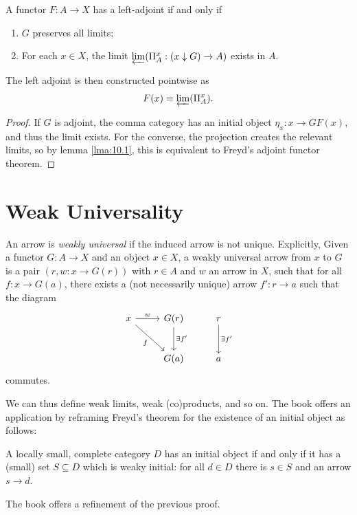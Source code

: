 \begin{theorem}\label{thm:10.1}
	A functor $F : A \to X$ has a left-adjoint if and only if
	\begin{enumerate}
		\item $G$ preserves all limits;
		\item For each $x\in X$, the limit $\varprojlim (\Pi_A^x : (x\downarrow G) \to A)$ exists in $A$.
	\end{enumerate}
	The left adjoint is then constructed pointwise as
	\[
		F(x)=\varprojlim (\Pi_A^x)
	.\]
\end{theorem}
\begin{proof}
	If $G$ is adjoint, the comma category has an initial object $\eta_x : x \to GF(x)$, and thus the limit exists. For the converse, the projection creates the relevant limits, so by lemma \ref{lma:10.1}, this is equivalent to Freyd's adjoint functor theorem.
\end{proof}

\section{Weak Universality}

\begin{definition}\label{dfn:10.1}
	An arrow is \emph{weakly universal} if the induced arrow is not unique. Explicitly, Given a functor $G : A \to X$ and an object $x\in X$, a weakly universal arrow from $x$ to $G$ is a pair $(r,w : x \to G(r))$ with $r\in A$ and $w$ an arrow in $X$, such that for all $f : x \to G(a)$, there exists a (not necessarily unique) arrow $f': r \to a$ such that the diagram
	\[\begin{tikzcd}[row sep = 2.5em, column sep = 2.5em]
	x \ar[" w ", r] \ar[" f "', dr]  & G(r)\ar[" \exists f' ", d]  & r \ar[" \exists f' ", d]  \\
	 & G(a) & a
	\end{tikzcd}\]
	commutes.
\end{definition}

We can thus define weak limits, weak (co)products, and so on. The book offers an application by reframing Freyd's theorem for the existence of an initial object as follows:

\begin{proposition}\label{prp:10.1}
	A locally small, complete category $D$ has an initial object if and only if it has a (small) set $S\subseteq D$ which is weaky initial: for all $d\in D$ there is $s\in S$ and an arrow $s\to d$.
\end{proposition}
The book offers a refinement of the previous proof.

